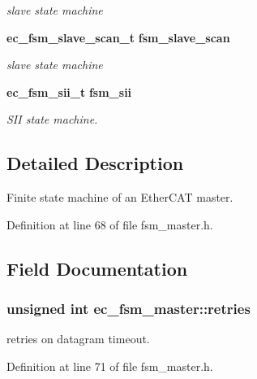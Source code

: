 \begin{DoxyCompactItemize}
\begin{DoxyCompactList}\small\item\em slave state machine \end{DoxyCompactList}\item 
{\bf ec\-\_\-fsm\-\_\-slave\-\_\-scan\-\_\-t} {\bf fsm\-\_\-slave\-\_\-scan}\label{structec__fsm__master_aeac9947df44bf439f0e1f2b1c1b7b33f}

\begin{DoxyCompactList}\small\item\em slave state machine \end{DoxyCompactList}\item 
{\bf ec\-\_\-fsm\-\_\-sii\-\_\-t} {\bf fsm\-\_\-sii}\label{structec__fsm__master_aeac629d016ca18930554d88646b1516f}

\begin{DoxyCompactList}\small\item\em \-S\-I\-I state machine. \end{DoxyCompactList}\end{DoxyCompactItemize}


\subsection{\-Detailed \-Description}
\-Finite state machine of an \-Ether\-C\-A\-T master. 

\-Definition at line 68 of file fsm\-\_\-master.\-h.



\subsection{\-Field \-Documentation}
\subsubsection[{retries}]{\setlength{\rightskip}{0pt plus 5cm}unsigned int {\bf ec\-\_\-fsm\-\_\-master\-::retries}}\label{structec__fsm__master_a6dea4cfd065a817b358441748378bd14}


retries on datagram timeout. 



\-Definition at line 71 of file fsm\-\_\-master.\-h.

